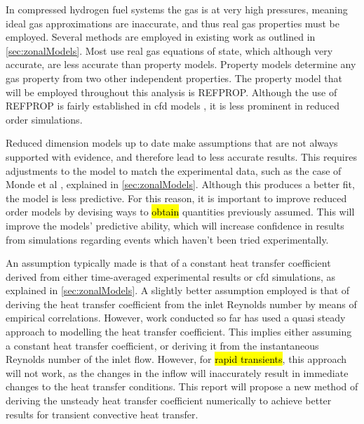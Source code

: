 In compressed hydrogen fuel systems the gas is at very high pressures, meaning ideal gas approximations are inaccurate, and thus real gas properties must be employed. Several methods are employed in existing work as outlined in \cref{sec:zonalModels}. Most use real gas equations of state, which although very accurate, are less accurate than property models. Property models determine any gas property from two other independent properties. The property model that will be employed throughout this analysis is REFPROP.  Although the use of REFPROP is fairly established in \gls{cfd} models \cite{Zhao2012,Zheng2013,Johnson2015}, it is less prominent in reduced order simulations.

Reduced dimension models up to date make assumptions that are not always supported with evidence, and therefore  lead to less accurate results. This requires adjustments to the model to match the experimental data, such as the case of Monde et al \cite{Monde2012}, explained in \cref{sec:zonalModels}. Although this produces a better fit, the model is less predictive. For this reason, it is important to improve reduced order models by devising ways to \hl{obtain} quantities previously assumed. This will improve the models' predictive ability, which will increase confidence in results from simulations regarding events which haven't been tried experimentally.


An assumption typically made is that of a constant heat transfer coefficient derived from either time-averaged experimental results or \gls{cfd} simulations, as explained in \cref{sec:zonalModels}. A slightly better assumption employed is that of deriving the heat transfer coefficient from the inlet Reynolds number by means of empirical correlations. However, work conducted so far has used a quasi steady approach to modelling the heat transfer coefficient. This implies either assuming a constant heat transfer coefficient, or deriving it from the instantaneous Reynolds number of the inlet flow. However, for \hl{rapid transients}, this approach will not work, as the changes in the inflow will inaccurately result in immediate changes to the heat transfer conditions. This report will propose a new method of deriving the unsteady heat transfer coefficient numerically to achieve better results for transient convective heat transfer. 

